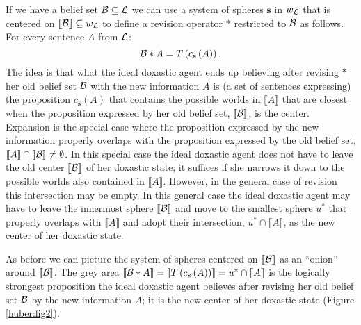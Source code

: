 If we have a belief set $\cal B\subseteq L$ we can use a system of spheres $\textbf{s}$ in $w_{\cal L}$ that is centered on $\llbracket\begin{cal}B\end{cal}\rrbracket\subseteq w_{\cal L}$ to define a revision operator $*$ restricted to $\cal B$ as follows. For every sentence $A$ from $\cal L$:
$$\begin{cal}B\end{cal}*A=T\left(c_{\textbf{s}}\left(A\right)\right).$$
The idea is that what the ideal doxastic agent ends up believing after revising $*$ her old belief set $\cal B$ with the new information $A$ is (a set of sentences expressing) the proposition $c_{\textbf{s}}\left(A\right)$ that contains the possible worlds in $\llbracket A\rrbracket$ that are closest when the proposition expressed by her old belief set, $\llbracket\cal B\rrbracket$, is the center. Expansion is the special case where the proposition expressed by the new information properly overlaps with the proposition expressed by the old belief set, $\llbracket A\rrbracket\cap\llbracket\cal B\rrbracket\neq\emptyset$. In this special case the ideal doxastic agent does not have to leave the old center $\llbracket\cal B\rrbracket$ of her doxastic state; it suffices if she narrows it down to the possible worlds also contained in $\llbracket A\rrbracket$. However, in the general case of revision this intersection may be empty. In this general case the ideal doxastic agent may have to leave the innermost sphere $\llbracket\cal B\rrbracket$ and move to the smallest sphere $u^*$ that properly overlaps with $\llbracket A\rrbracket$ and adopt their intersection, $u^*\cap\llbracket A\rrbracket$, as the new center of her doxastic state.

As before we can picture the system of spheres centered on $\llbracket\cal B\rrbracket$ as an ``onion'' around $\llbracket\cal B\rrbracket$. The grey area $\llbracket\begin{cal}B\end{cal}*A\rrbracket=\llbracket T\left(c_{\textbf{s}}\left(A\right)\right)\rrbracket=u^*\cap\llbracket A\rrbracket$ is the logically strongest proposition the ideal doxastic agent believes after revising her old belief set $\cal B$ by the new information $A$; it is the new center of her doxastic state (Figure \ref{huber:fig2}).

